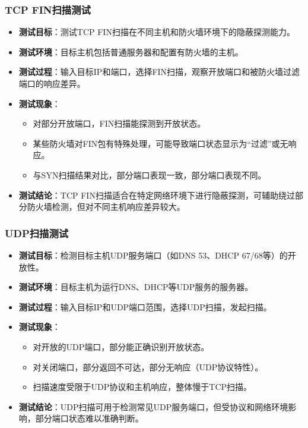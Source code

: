 \documentclass[12pt,hyperref,a4paper,UTF8]{ctexart}
\begin{document}
\subsubsection{TCP FIN扫描测试}
\begin{itemize}
    \item \textbf{测试目标}：测试TCP FIN扫描在不同主机和防火墙环境下的隐蔽探测能力。
    \item \textbf{测试环境}：目标主机包括普通服务器和配置有防火墙的主机。
    \item \textbf{测试过程}：输入目标IP和端口，选择FIN扫描，观察开放端口和被防火墙过滤端口的响应差异。
    \item \textbf{测试现象}：
        \begin{itemize}
            \item 对部分开放端口，FIN扫描能探测到开放状态。
            \item 某些防火墙对FIN包有特殊处理，可能导致端口状态显示为“过滤”或无响应。
            \item 与SYN扫描结果对比，部分端口表现一致，部分端口表现不同。
        \end{itemize}
    \item \textbf{测试结论}：TCP FIN扫描适合在特定网络环境下进行隐蔽探测，可辅助绕过部分防火墙检测，但对不同主机响应差异较大。
\end{itemize}


\subsubsection{UDP扫描测试}
\begin{itemize}
    \item \textbf{测试目标}：检测目标主机UDP服务端口（如DNS 53、DHCP 67/68等）的开放性。
    \item \textbf{测试环境}：目标主机为运行DNS、DHCP等UDP服务的服务器。
    \item \textbf{测试过程}：输入目标IP和UDP端口范围，选择UDP扫描，发起扫描。
    \item \textbf{测试现象}：
        \begin{itemize}
            \item 对开放的UDP端口，部分能正确识别开放状态。
            \item 对关闭端口，部分返回不可达，部分无响应（UDP协议特性）。
            \item 扫描速度受限于UDP协议和主机响应，整体慢于TCP扫描。
        \end{itemize}
    \item \textbf{测试结论}：UDP扫描可用于检测常见UDP服务端口，但受协议和网络环境影响，部分端口状态难以准确判断。
\end{itemize}
\end{document}
